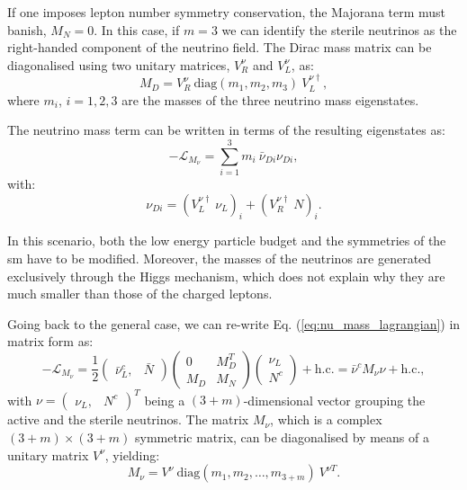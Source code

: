 If one imposes lepton number symmetry conservation, the Majorana term must banish, $M_{N}=0$. In this case, if $m=3$ we can identify the sterile neutrinos as the right-handed component of the neutrino field. The Dirac mass matrix can be diagonalised using two unitary matrices, $V^{\nu}_{R}$ and $V^{\nu}_{L}$, as:
\begin{equation}
	M_{D} = V^{\nu}_{R}~\mathrm{diag}(m_{1}, m_{2}, m_{3})~V^{\nu \dagger}_{L},
\end{equation}
where $m_{i}$, $i=1,2,3$ are the masses of the three neutrino mass eigenstates.

The neutrino mass term can be written in terms of the resulting eigenstates as:
\begin{equation}
	-\mathcal{L}_{M_{\nu}} = \sum_{i=1}^{3} m_{i}~\bar{\nu}_{Di} \nu_{Di},
\end{equation}
with:
\begin{equation}
	\nu_{Di} = \left(V^{\nu \dagger}_{L}~\nu_{L}\right)_{i} + \left(V^{\nu \dagger}_{R}~N\right)_{i}.
\end{equation}

In this scenario, both the low energy particle budget and the symmetries of the \gls{sm} have to be modified. Moreover, the masses of the neutrinos are generated exclusively through the Higgs mechanism, which does not explain why they are much smaller than those of the charged leptons.

Going back to the general case, we can re-write Eq. (\ref{eq:nu_mass_lagrangian}) in matrix form as:
\begin{equation}
	-\mathcal{L}_{M_{\nu}} = \frac{1}{2} \begin{pmatrix}\bar{\nu}^{c}_{L},&\bar{N}\end{pmatrix} \begin{pmatrix}0 & M_{D}^{T}\\M_{D} & M_{N}\end{pmatrix}\begin{pmatrix}\nu_{L}\\N^{c}\end{pmatrix} + \mathrm{h.c.} = \bar{\nu}^{c} M_{\nu} \nu + \mathrm{h.c.},
\end{equation}
with $\nu=\begin{pmatrix}\nu_{L}, & N^{c}\end{pmatrix}^{T}$ being a $(3+m)$-dimensional vector grouping the active and the sterile neutrinos. The matrix $M_{\nu}$, which is a complex $(3+m)\times(3+m)$ symmetric matrix, can be diagonalised by means of a unitary matrix $V^{\nu}$, yielding:
\begin{equation}
	M_{\nu} = V^{\nu}~\mathrm{diag}(m_{1}, m_{2}, \dots, m_{3+m})~V^{\nu T}.
\end{equation}

